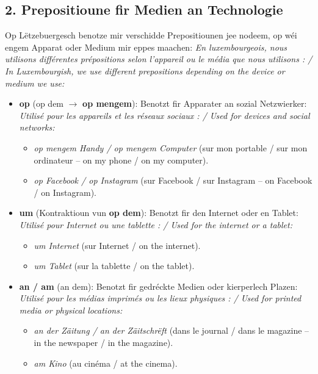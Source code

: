 \subsection*{2. Prepositioune fir Medien an Technologie}
Op Lëtzebuergesch benotze mir verschidde Prepositiounen jee nodeem, op wéi engem Apparat oder Medium mir eppes maachen:
\textit{En luxembourgeois, nous utilisons différentes prépositions selon l'appareil ou le média que nous utilisons : / In Luxembourgish, we use different prepositions depending on the device or medium we use:}
\begin{itemize}
    \item \textbf{op} (op dem $\rightarrow$ \textbf{op mengem}): Benotzt fir Apparater an sozial Netzwierker: \\
    \textit{Utilisé pour les appareils et les réseaux sociaux : / Used for devices and social networks:}
    \begin{itemize}
        \item \textit{op mengem Handy / op mengem Computer} (sur mon portable / sur mon ordinateur -- on my phone / on my computer).
        \item \textit{op Facebook / op Instagram} (sur Facebook / sur Instagram -- on Facebook / on Instagram).
    \end{itemize}
    \item \textbf{um} (Kontraktioun vun \textbf{op dem}): Benotzt fir den Internet oder en Tablet: \\
    \textit{Utilisé pour Internet ou une tablette : / Used for the internet or a tablet:}
    \begin{itemize}
        \item \textit{um Internet} (sur Internet / on the internet).
        \item \textit{um Tablet} (sur la tablette / on the tablet).
    \end{itemize}
    \item \textbf{an / am} (an dem): Benotzt fir gedréckte Medien oder kierperlech Plazen: \\
    \textit{Utilisé pour les médias imprimés ou les lieux physiques : / Used for printed media or physical locations:}
    \begin{itemize}
        \item \textit{an der Zäitung / an der Zäitschrëft} (dans le journal / dans le magazine -- in the newspaper / in the magazine).
        \item \textit{am Kino} (au cinéma / at the cinema).
    \end{itemize}
\end{itemize}

